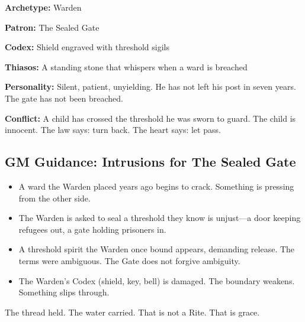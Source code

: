 \textbf{Archetype:} Warden

\textbf{Patron:} The Sealed Gate

\textbf{Codex:} Shield engraved with threshold sigils

\textbf{Thiasos:} A standing stone that whispers when a ward is breached

\textbf{Personality:} Silent, patient, unyielding. He has not left his post in seven years. The gate has not been breached.

\textbf{Conflict:} A child has crossed the threshold he was sworn to guard. The child is innocent. The law says: turn back. The heart says: let pass.

\subsection{GM Guidance: Intrusions for The Sealed Gate}

\begin{itemize}
\item A ward the Warden placed years ago begins to crack. Something is pressing from the other side.
\item The Warden is asked to seal a threshold they know is unjust—a door keeping refugees out, a gate holding prisoners in.
\item A threshold spirit the Warden once bound appears, demanding release. The terms were ambiguous. The Gate does not forgive ambiguity.
\item The Warden's Codex (shield, key, bell) is damaged. The boundary weakens. Something slips through.
\end{itemize}

The thread held. The water carried. That is not a Rite. That is grace.
